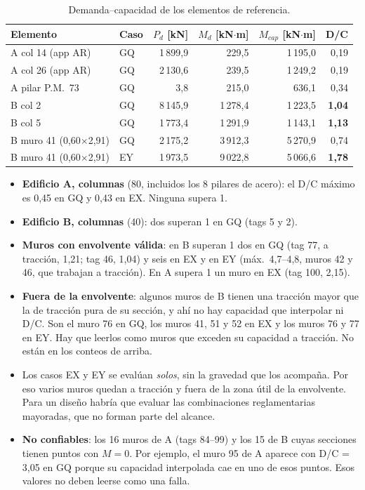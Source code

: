 \documentclass[11pt,a4paper]{article}
\begin{document}
\begin{table}[h]
\centering
\caption{Demanda--capacidad de los elementos de referencia.}
\begin{tabular}{llrrrr}
\toprule
Elemento & Caso & $P_d$ [kN] & $M_d$ [kN$\cdot$m] & $M_{cap}$ [kN$\cdot$m] & D/C \\
\midrule
A col 14 (app AR) & GQ & 1\,899,9 & 229,5 & 1\,195,0 & 0,19 \\
A col 26 (app AR) & GQ & 2\,130,6 & 239,5 & 1\,249,2 & 0,19 \\
A pilar P.M.\ 73 & GQ & 3,8 & 215,0 & 636,1 & 0,34 \\
B col 2 & GQ & 8\,145,9 & 1\,278,4 & 1\,223,5 & \textbf{1,04} \\
B col 5 & GQ & 1\,773,4 & 1\,291,9 & 1\,143,1 & \textbf{1,13} \\
B muro 41 (0,60$\times$2,91) & GQ & 2\,175,2 & 3\,912,3 & 5\,270,9 & 0,74 \\
B muro 41 (0,60$\times$2,91) & EY & 1\,973,5 & 9\,022,8 & 5\,066,6 & \textbf{1,78} \\
\bottomrule
\end{tabular}
\end{table}

\begin{itemize}
  \item \textbf{Edificio A, columnas} (80, incluidos los 8 pilares de acero):
        el D/C máximo es 0,45 en GQ y 0,43 en EX. Ninguna supera 1.
  \item \textbf{Edificio B, columnas} (40): dos superan 1 en GQ (tags 5 y 2).
  \item \textbf{Muros con envolvente válida}: en B superan 1 dos en GQ (tag 77,
        a tracción, 1,21; tag 46, 1,04) y seis en EX y en EY (máx.\ 4,7--4,8,
        muros 42 y 46, que trabajan a tracción). En A supera 1 un muro en EX
        (tag 100, 2,15).
  \item \textbf{Fuera de la envolvente}: algunos muros de B tienen una
        tracción mayor que la de tracción pura de su sección, y ahí no hay
        capacidad que interpolar ni D/C. Son el muro 76 en GQ, los muros 41, 51
        y 52 en EX y los muros 76 y 77 en EY. Hay que leerlos como muros que
        exceden su capacidad a tracción. No están en los conteos de arriba.
  \item Los casos EX y EY se evalúan \emph{solos}, sin la gravedad que los
        acompaña. Por eso varios muros quedan a tracción y fuera de la zona útil
        de la envolvente. Para un diseño habría que evaluar las combinaciones
        reglamentarias mayoradas, que no forman parte del alcance.
  \item \textbf{No confiables}: los 16 muros de A (tags 84--99) y los 15 de B
        cuyas secciones tienen puntos con $M = 0$. Por ejemplo, el muro 95 de A
        aparece con D/C = 3,05 en GQ porque su capacidad interpolada cae en uno
        de esos puntos. Esos valores no deben leerse como una falla.
\end{itemize}
\end{document}
